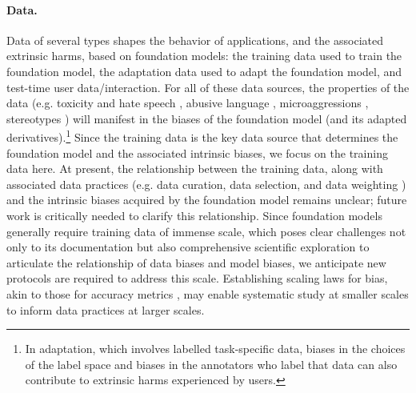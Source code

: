 \paragraph{Data.}
Data of several types shapes the behavior of applications, and the associated extrinsic harms, based on foundation models: the training data used to train the foundation model, the adaptation data used to adapt the foundation model, and test-time user data/interaction. For all of these data sources, the properties of the data (e.g. toxicity and hate speech \citep{henderson17ethical},  abusive language \citep{waseem-etal-2017-understanding}, microaggressions \citep{breitfeller-etal-2019-finding}, stereotypes \citep{voigt-etal-2018-rtgender}) will manifest in the biases of the foundation model (and its adapted derivatives).\footnote{In adaptation, which involves labelled task-specific data, biases in the choices of the label space \cite{crawford2021} and biases in the annotators who label that data \citep{geva-etal-2019-modeling,sap-etal-2019-risk} can also contribute to extrinsic harms experienced by users.} Since the training data is the key data source that determines the foundation model and the associated intrinsic biases, we focus on the training data here. At present, the relationship between the training data, along with associated data practices (e.g. data curation, data selection, and data weighting \citep{paullada2020, bender2021, rogers2021}) and the intrinsic biases acquired by the foundation model remains unclear; future work is critically needed to clarify this relationship. Since foundation models generally require training data of immense scale, which poses clear challenges not only to its documentation \citep{bender2021} but also comprehensive scientific exploration to articulate the relationship of data biases and model biases, we anticipate new protocols are required to address this scale. Establishing scaling laws for bias, akin to those for accuracy metrics \citep{kaplan2020, henighan2020}, may enable systematic study at smaller scales to inform data practices at larger scales.

